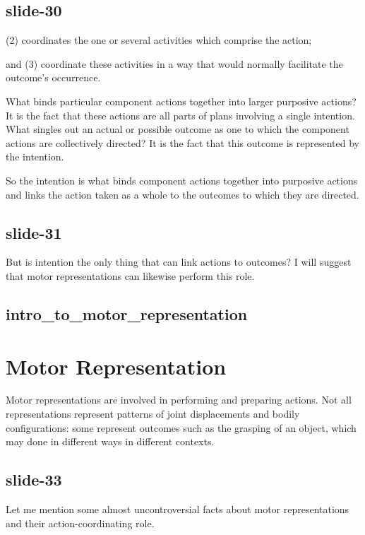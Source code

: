 \documentclass[12pt,\papersize]{extarticle}
\begin{document}
\subsection{slide-30}
(2) coordinates the one or several activities which comprise the action;

and (3) coordinate these activities in a way that would normally facilitate the outcome’s occurrence.

What binds particular component actions together into larger purposive actions?
It is the fact that these actions are all parts of plans involving a single intention.
What singles out an actual or possible outcome as one to which the component
actions are collectively directed?  It is the fact that this outcome is
represented by the intention.

So the intention is what binds component actions together into purposive actions and
links the action taken as a whole to the outcomes to which they are directed.

\subsection{slide-31}
But is intention the only thing that can link actions to outcomes?
I will suggest that motor representations can likewise perform this role.

\subsection{intro\_to\_motor\_representation}


\section{Motor Representation}

Motor representations are involved in performing and preparing actions.
Not all representations represent patterns of joint displacements and bodily
configurations: some represent outcomes such as the grasping of an object, which
may done in different ways in different contexts.

\subsection{slide-33}
Let me mention some almost uncontroversial facts about motor representations and
their action-coordinating role.
\end{document}
